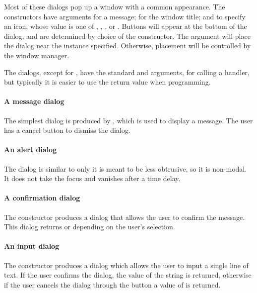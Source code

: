 Most of these dialogs pop up a window with a common appearance. The
constructors have arguments  for a
message;  for the window title; and
 to specify an icon, whose value is one of
, , , or
. Buttons will appear at the bottom of the dialog,
and are determined by choice of the constructor. The
 argument will place the dialog near the
 instance specified. Otherwise, placement will be
controlled by the window manager.

The dialogs, except for , have the standard
 and  arguments, for calling a handler, but
typically it is easier to use the return value when programming.

\paragraph{A message dialog}
The simplest dialog is produced by , which is used to
display a message. The user has a cancel button to dismiss the dialog.

\paragraph{An alert dialog}
The  dialog is similar to  only it is meant
to be less obtrusive, so it is non-modal. It does not take the focus and vanishes after a time delay.

\paragraph{A confirmation dialog}
The constructor  produces a dialog that allows
the user to confirm the message. This dialog returns  or
 depending on the user's selection.


\paragraph{An input dialog}
The  constructor produces a dialog which allows
the user to input a single line of text. If the user confirms the
dialog, the value of the string is returned, otherwise if the user
cancels the dialog through the button a value of  is returned.




